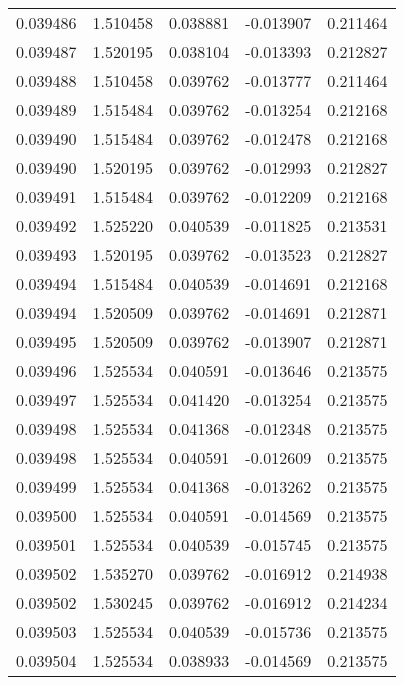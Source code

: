 \begin{tabular}{lrrrr}
0.039486    &  1.510458 &  0.038881 & -0.013907 &             0.211464 \\
0.039487    &  1.520195 &  0.038104 & -0.013393 &             0.212827 \\
0.039488    &  1.510458 &  0.039762 & -0.013777 &             0.211464 \\
0.039489    &  1.515484 &  0.039762 & -0.013254 &             0.212168 \\
0.039490    &  1.515484 &  0.039762 & -0.012478 &             0.212168 \\
0.039490    &  1.520195 &  0.039762 & -0.012993 &             0.212827 \\
0.039491    &  1.515484 &  0.039762 & -0.012209 &             0.212168 \\
0.039492    &  1.525220 &  0.040539 & -0.011825 &             0.213531 \\
0.039493    &  1.520195 &  0.039762 & -0.013523 &             0.212827 \\
0.039494    &  1.515484 &  0.040539 & -0.014691 &             0.212168 \\
0.039494    &  1.520509 &  0.039762 & -0.014691 &             0.212871 \\
0.039495    &  1.520509 &  0.039762 & -0.013907 &             0.212871 \\
0.039496    &  1.525534 &  0.040591 & -0.013646 &             0.213575 \\
0.039497    &  1.525534 &  0.041420 & -0.013254 &             0.213575 \\
0.039498    &  1.525534 &  0.041368 & -0.012348 &             0.213575 \\
0.039498    &  1.525534 &  0.040591 & -0.012609 &             0.213575 \\
0.039499    &  1.525534 &  0.041368 & -0.013262 &             0.213575 \\
0.039500    &  1.525534 &  0.040591 & -0.014569 &             0.213575 \\
0.039501    &  1.525534 &  0.040539 & -0.015745 &             0.213575 \\
0.039502    &  1.535270 &  0.039762 & -0.016912 &             0.214938 \\
0.039502    &  1.530245 &  0.039762 & -0.016912 &             0.214234 \\
0.039503    &  1.525534 &  0.040539 & -0.015736 &             0.213575 \\
0.039504    &  1.525534 &  0.038933 & -0.014569 &             0.213575 \\

\end{tabular}
